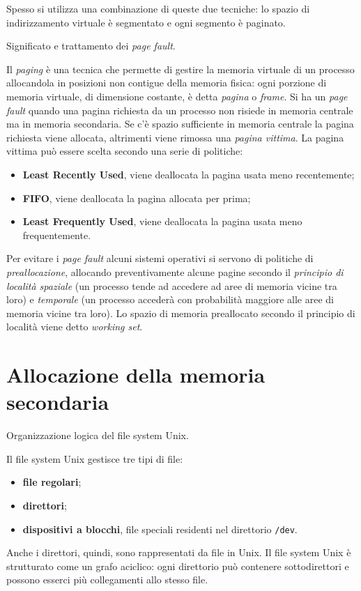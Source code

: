 \documentclass[answers,a4paper,12pt]{exam}
\begin{document}
\begin{questions}
\begin{solutionorlines}[3.8in]
\begin{itemize}
\begin{itemize}
		\end{itemize}
	Spesso si utilizza una combinazione di queste due tecniche: lo spazio di indirizzamento virtuale è segmentato e ogni segmento è paginato. 
	\end{itemize}
\end{solutionorlines}
\question
Significato e trattamento dei \textit{page fault}.
\begin{solutionorlines}[3.8in]Il \textit{paging} è una tecnica che permette di gestire la memoria virtuale di un processo allocandola in posizioni non contigue della memoria fisica: ogni porzione di memoria virtuale, di dimensione costante, è detta \textit{pagina} o \textit{frame}. Si ha un \textit{page fault} quando una pagina richiesta da un processo non risiede in memoria centrale ma in memoria secondaria. Se c'è spazio sufficiente in memoria centrale la pagina richiesta viene allocata, altrimenti viene rimossa una \textit{pagina vittima}. La pagina vittima può essere scelta secondo una serie di politiche:
\begin{itemize}
\item \textbf{Least Recently Used}, viene deallocata la pagina usata meno recentemente;
\item \textbf{FIFO}, viene deallocata la pagina allocata per prima;
\item \textbf{Least Frequently Used}, viene deallocata la pagina usata meno frequentemente.
\end{itemize} 
Per evitare i \textit{page fault} alcuni sistemi operativi si servono di politiche di \textit{preallocazione}, allocando preventivamente alcune pagine secondo il \textit{principio di località spaziale} (un processo tende ad accedere ad aree di memoria vicine tra loro) e \textit{temporale} (un processo accederà con probabilità maggiore alle aree di memoria vicine tra loro). Lo spazio di memoria preallocato secondo il principio di località viene detto \textit{working set}. \end{solutionorlines}
\section{Allocazione della memoria secondaria}
\question
Organizzazione logica del file system Unix.
\begin{solutionorlines}[3.8in]
	
	Il file system Unix gestisce tre tipi di file:
	\begin{itemize}
		\item \textbf{file regolari};
		\item \textbf{direttori};
		\item \textbf{dispositivi a blocchi}, file speciali residenti nel direttorio \texttt{/dev}.
	\end{itemize}
Anche i direttori, quindi, sono rappresentati da file in Unix.
Il file system Unix è strutturato come un grafo aciclico: ogni direttorio può contenere sottodirettori e possono esserci più collegamenti allo stesso file. 


\end{solutionorlines}
\end{questions}
\end{document}
